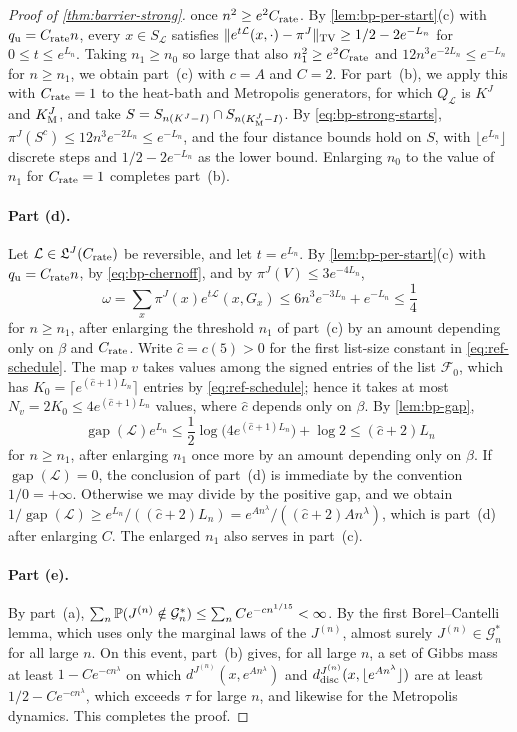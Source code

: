 \begin{proof}[Proof of \cref{thm:barrier-strong}]
once $n^2\ge e^2C_{\rm rate}$. By \cref{lem:bp-per-start}(c) with $q_{\rm u}=C_{\rm rate}n$, every $x\in S_{\mathcal L}$ satisfies $\lVert e^{t\mathcal L}(x,\cdot)-\pi^J\rVert_{\mathrm{TV}}\ge1/2-2e^{-L_n}$ for $0\le t\le e^{L_n}$. Taking $n_1\ge n_0$ so large that also $n_1^2\ge e^2C_{\rm rate}$ and $12n^3e^{-2L_n}\le e^{-L_n}$ for $n\ge n_1$, we obtain part~(c) with $c=A$ and $C=2$. For part~(b), we apply this with $C_{\rm rate}=1$ to the heat-bath and Metropolis generators, for which $Q_{\mathcal L}$ is $K^J$ and $K^J_{\rm M}$, and take $S=S_{n(K^J-I)}\cap S_{n(K^J_{\rm M}-I)}$. By \eqref{eq:bp-strong-starts}, $\pi^J(S^c)\le12n^3e^{-2L_n}\le e^{-L_n}$, and the four distance bounds hold on $S$, with $\lfloor e^{L_n}\rfloor$ discrete steps and $1/2-2e^{-L_n}$ as the lower bound. Enlarging $n_0$ to the value of $n_1$ for $C_{\rm rate}=1$ completes part~(b).

\paragraph{Part (d).} Let $\mathcal L\in\mathfrak L^J(C_{\rm rate})$ be reversible, and let $t=e^{L_n}$. By \cref{lem:bp-per-start}(c) with $q_{\rm u}=C_{\rm rate}n$, by \eqref{eq:bp-chernoff}, and by $\pi^J(V)\le3e^{-4L_n}$,
\[
 \omega=\sum_x\pi^J(x)e^{t\mathcal L}(x,G_x)\le6n^3e^{-3L_n}+e^{-L_n}\le\frac14
\]
for $n\ge n_1$, after enlarging the threshold $n_1$ of part~(c) by an amount depending only on $\beta$ and $C_{\rm rate}$. Write $\widehat c=c(5)>0$ for the first list-size constant in \eqref{eq:ref-schedule}. The map $v$ takes values among the signed entries of the list $\mathcal F_0$, which has $K_0=\lceil e^{(\widehat c+1)L_n}\rceil$ entries by \eqref{eq:ref-schedule}; hence it takes at most $N_v=2K_0\le4e^{(\widehat c+1)L_n}$ values, where $\widehat c$ depends only on $\beta$. By \cref{lem:bp-gap},
\[
 \operatorname{gap}(\mathcal L)e^{L_n}\le\frac12\log\bigl(4e^{(\widehat c+1)L_n}\bigr)+\log2\le(\widehat c+2)L_n
\]
for $n\ge n_1$, after enlarging $n_1$ once more by an amount depending only on $\beta$. If $\operatorname{gap}(\mathcal L)=0$, the conclusion of part~(d) is immediate by the convention $1/0=+\infty$. Otherwise we may divide by the positive gap, and we obtain $1/\operatorname{gap}(\mathcal L)\ge e^{L_n}/((\widehat c+2)L_n)=e^{An^\lambda}/((\widehat c+2)An^\lambda)$, which is part~(d) after enlarging $C$. The enlarged $n_1$ also serves in part~(c).

\paragraph{Part (e).} By part~(a), $\sum_n\mathbb P(J^{(n)}\notin\mathcal G_n^*)\le\sum_nCe^{-cn^{1/15}}<\infty$. By the first Borel--Cantelli lemma, which uses only the marginal laws of the $J^{(n)}$, almost surely $J^{(n)}\in\mathcal G_n^*$ for all large $n$. On this event, part~(b) gives, for all large $n$, a set of Gibbs mass at least $1-Ce^{-cn^\lambda}$ on which $d^{J^{(n)}}(x,e^{An^\lambda})$ and $d^{J^{(n)}}_{\rm disc}(x,\lfloor e^{An^\lambda}\rfloor)$ are at least $1/2-Ce^{-cn^\lambda}$, which exceeds $\tau$ for large $n$, and likewise for the Metropolis dynamics. This completes the proof.
\end{proof}
